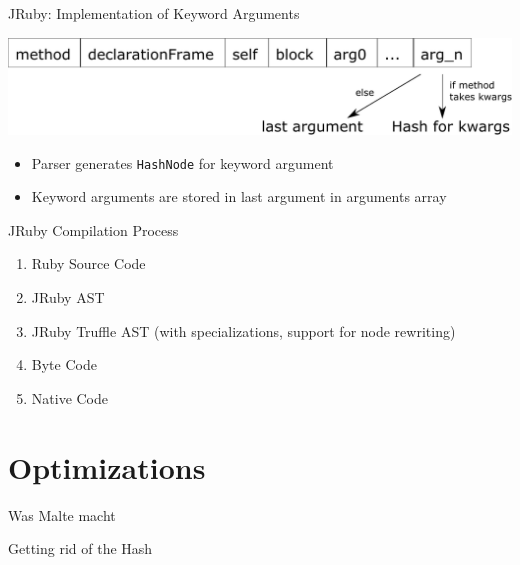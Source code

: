 \documentclass[xcolor=dvipsname,handout]{beamer} %
\begin{document}
\begin{frame}{JRuby: Implementation of Keyword Arguments}
\begin{table}
    \centering
    \includegraphics[width=\textwidth]{method_args_array.pdf}
\end{table}

\begin{itemize}
    \item Parser generates \lstinline{HashNode} for keyword argument
    \item Keyword arguments are stored in last argument in arguments array
\end{itemize}
\end{frame}

\begin{frame}{JRuby Compilation Process}
\begin{enumerate}
    \item Ruby Source Code
    \item JRuby AST
    \item JRuby Truffle AST (with specializations, support for node rewriting)
    \item Byte Code
    \item Native Code 
\end{enumerate}
\end{frame}

\section{Optimizations}
\begin{frame}{Was Malte macht}

\end{frame}

\begin{frame}{Getting rid of the Hash}

\end{frame}
\end{document}
